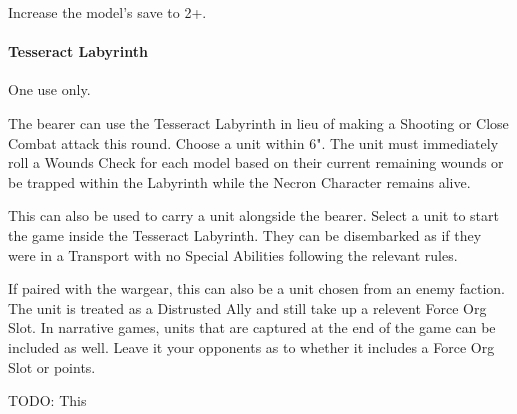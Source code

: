 Increase the model's save to 2+.

\paragraph*{Tesseract Labyrinth} \label{Tesseract Labyrinth}

One use only.

The bearer can use the Tesseract Labyrinth in lieu of making a Shooting or Close Combat attack this round. Choose a unit within 6". The unit must immediately roll a Wounds Check for each model based on their current remaining wounds or be trapped within the Labyrinth while the Necron Character remains alive.

This can also be used to carry a unit alongside the bearer. Select a unit to start the game inside the Tesseract Labyrinth. They can be disembarked as if they were in a Transport with no Special Abilities following the relevant rules. 

If paired with the  wargear, this can also be a unit chosen from an enemy faction. The unit is treated as a Distrusted Ally and still take up a relevent Force Org Slot. In narrative games, units that are captured at the end of the game can be included as well. Leave it your opponents as to whether it includes a Force Org Slot or points.

 \label{Artefacts of the Aeons}

TODO: This

